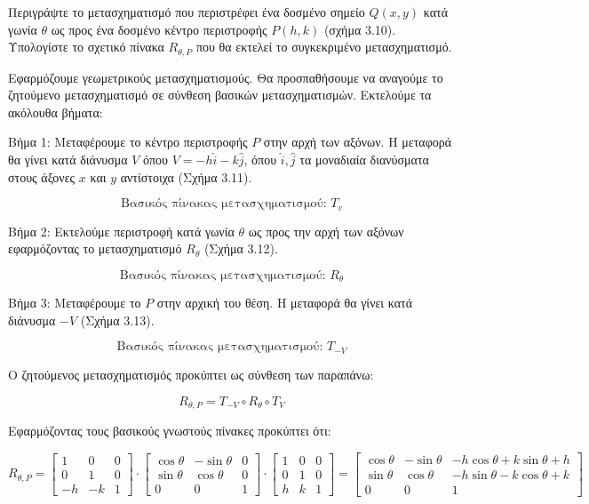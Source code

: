 \begin{example}
Περιγράψτε το μετασχηματισμό που περιστρέφει ένα δοσμένο σημείο $Q(x, y)$ κατά γωνία $\theta$ ως προς ένα δοσμένο κέντρο περιστροφής $P(h, k)$ (σχήμα 3.10). Υπολογίστε το σχετικό πίνακα $R_{\theta, P}$ που θα εκτελεί το συγκεκριμένο μετασχηματισμό.
%
\end{example}

\begin{solution}
	


Εφαρμόζουμε γεωμετρικούς μετασχηματισμούς. Θα προσπαθήσουμε να αναγούμε το ζητούμενο μετασχηματισμό σε σύνθεση βασικών μετασχηματισμών. Εκτελούμε τα ακόλουθα βήματα:

Βήμα 1: Μεταφέρουμε το κέντρο περιστροφής $P$ στην αρχή των αξόνων. Η μεταφορά θα γίνει κατά διάνυσμα $V$ όπου $V = -h\hat{i} - k\hat{j}$, όπου $\hat{i}, \hat{j}$ τα μοναδιαία διανύσματα στους άξονες $x$ και $y$ αντίστοιχα (Σχήμα 3.11).

\[
\text{Βασικός πίνακας μετασχηματισμού: } T_v
\]

%

Βήμα 2: Εκτελούμε περιστροφή κατά γωνία $\theta$ ως προς την αρχή των αξόνων εφαρμόζοντας το μετασχηματισμό $R_\theta$ (Σχήμα 3.12).

\[
\text{Βασικός πίνακας μετασχηματισμού: } R_\theta
\]
%

Βήμα 3: Μεταφέρουμε το $P$ στην αρχική του θέση. Η μεταφορά θα γίνει κατά διάνυσμα $-V$ (Σχήμα 3.13).

\[
\text{Βασικός πίνακας μετασχηματισμού: } T_{-V}
\]

%

Ο ζητούμενος μετασχηματισμός προκύπτει ως σύνθεση των παραπάνω:

\[
R_{\theta,P} = T_{-V} \circ R_\theta \circ T_V
\]

Εφαρμόζοντας τους βασικούς γνωστούς πίνακες προκύπτει ότι:

\[
R_{\theta,P} =
\begin{bmatrix}
1 & 0 & 0 \\
0 & 1 & 0 \\
-h & -k & 1
\end{bmatrix}
\cdot
\begin{bmatrix}
\cos\theta & -\sin\theta & 0 \\
\sin\theta & \cos\theta & 0 \\
0 & 0 & 1
\end{bmatrix}
\cdot
\begin{bmatrix}
1 & 0 & 0 \\
0 & 1 & 0 \\
h & k & 1
\end{bmatrix}
=
\begin{bmatrix}
\cos\theta & -\sin\theta & -h\cos\theta + k\sin\theta + h \\
\sin\theta & \cos\theta & -h\sin\theta - k\cos\theta + k \\
0 & 0 & 1
\end{bmatrix}
\]


\end{solution}
